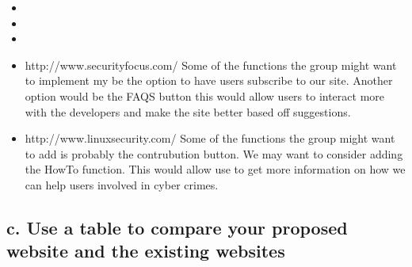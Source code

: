 \documentclass{article}
\begin{document}
\begin{itemize}
    \item %
    
    \item %
    
    \item %
    
    \item %

          http://www.securityfocus.com/ Some of the functions the group might want to implement my be the option to have users subscribe to our site.
    Another option would be the FAQS button this would allow users to interact more with the developers and make the site better based off suggestions. 
    
    \item  %

         http://www.linuxsecurity.com/ Some of the functions the group might want to add is probably the contrubution button. We may want
         to consider adding the HowTo function. This would allow use to get more information on how we can help users involved in cyber crimes.



    
\end{itemize}


\subsection{c. Use a table to compare your proposed website and the existing websites}
\end{document}
